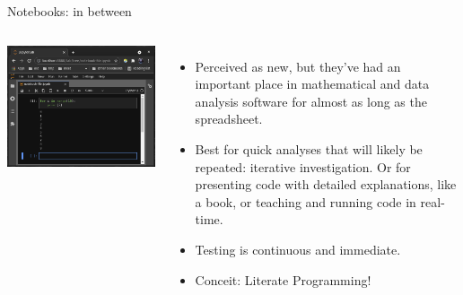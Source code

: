 \documentclass[aspectratio=169]{beamer}
\begin{document}
\begin{frame}{Notebooks: in between}
\vspace{0.2 cm}
\begin{columns}
\includegraphics[width=\linewidth]{img/fundamental-3-modes-notebook.png}

\large
\begin{itemize}\setlength{\itemsep}{0.25 cm}
\item<1-> Perceived as new, but they've had an important place in mathematical and data analysis software for almost as long as the spreadsheet.
\item<2-> Best for quick analyses that will likely be repeated: iterative investigation. Or for presenting code with detailed explanations, like a book, or teaching and running code in real-time.
\item<3-> Testing is continuous and immediate.
\item<4-> Conceit: Literate Programming!
\end{itemize}
\end{columns}
\end{frame}
\end{document}
